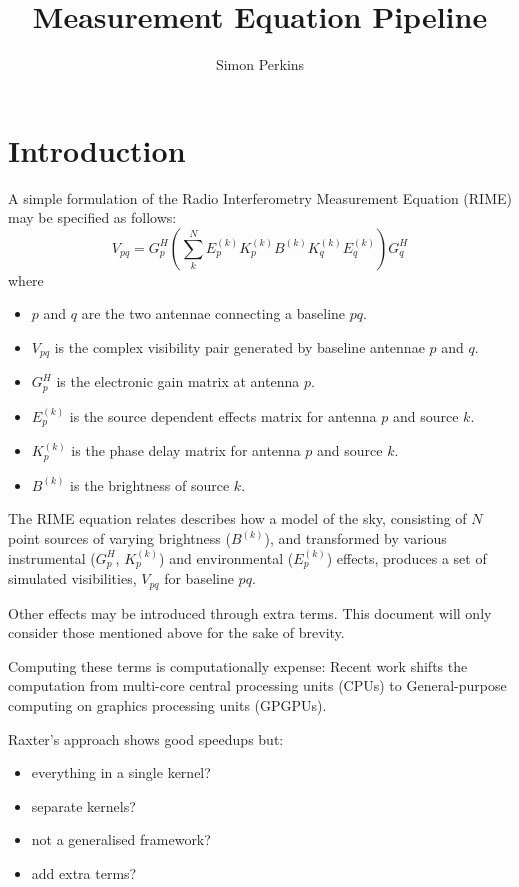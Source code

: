 \documentclass[]{article}
\title{Measurement Equation Pipeline}
\author{Simon Perkins}
\begin{document}
\maketitle

\section{Introduction}

A simple formulation of the Radio Interferometry Measurement Equation (RIME) may be specified as follows:
$$
V_{pq} = G_p^H \left( \sum_k^N E_p^{(k)} K_p^{(k)} B^{(k)} K_q^{(k)} E_q^{(k)}  \right) G_q^H
$$
where
\begin{itemize}
\item $p$ and $q$ are the two antennae connecting a baseline $pq$.
\item $V_{pq}$ is the complex visibility pair generated by baseline antennae $p$ and $q$.
\item $G_p^H$ is the electronic gain matrix at antenna $p$.
\item $E_p^{(k)}$ is the source dependent effects matrix for antenna $p$ and source $k$.
\item $K_p^{(k)}$ is the phase delay matrix for antenna $p$ and source $k$.
\item $B^{(k)}$ is the brightness of source $k$.
\end{itemize}

The RIME equation relates describes how a model of the sky, consisting of $N$ point sources of varying brightness ($B^{(k)}$), and transformed by various instrumental ($G_p^H$, $K_p^{(k)}$) and environmental ($E_p^{(k)}$) effects, produces a set of simulated visibilities, $V_{pq}$ for baseline $pq$.

Other effects may be introduced through extra terms. This document will only consider those mentioned above for the sake of brevity.

Computing these terms is computationally expense: Recent work \cite{Baxter2012} shifts the computation from multi-core central processing units (CPUs) to General-purpose computing on graphics processing units (GPGPUs).

Raxter's approach shows good speedups but:

\begin{itemize}
\item everything in a single kernel?
\item separate kernels?
\item not a generalised framework?
\item add extra terms?
\end{itemize}
\end{document}

